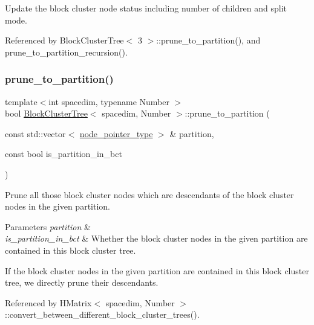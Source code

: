 Update the block cluster node status including number of children and split mode.

Referenced by Block\+Cluster\+Tree$<$ 3 $>$\+::prune\+\_\+to\+\_\+partition(), and prune\+\_\+to\+\_\+partition\+\_\+recursion().

\mbox{\label{classBlockClusterTree_af1663a109b6fd5c67c85e9bb88a54a13}} 
\subsubsection{\texorpdfstring{prune\+\_\+to\+\_\+partition()}{prune\_to\_partition()}}
{\footnotesize\ttfamily template$<$int spacedim, typename Number $>$ \\
bool \hyperlink{classBlockClusterTree}{Block\+Cluster\+Tree}$<$ spacedim, Number $>$\+::prune\+\_\+to\+\_\+partition (\begin{DoxyParamCaption}\item[{const std\+::vector$<$ \hyperlink{classTreeNode}{node\+\_\+pointer\+\_\+type} $>$ \&}]{partition,  }\item[{const bool}]{is\+\_\+partition\+\_\+in\+\_\+bct }\end{DoxyParamCaption})}

Prune all those block cluster nodes which are descendants of the block cluster nodes in the given partition.


\begin{DoxyParams}{Parameters}
{\em partition} & \\
\hline
{\em is\+\_\+partition\+\_\+in\+\_\+bct} & Whether the block cluster nodes in the given {\ttfamily partition} are contained in this block cluster tree. \\
\hline
\end{DoxyParams}
If the block cluster nodes in the given {\ttfamily partition} are contained in this block cluster tree, we directly prune their descendants.

Referenced by H\+Matrix$<$ spacedim, Number $>$\+::convert\+\_\+between\+\_\+different\+\_\+block\+\_\+cluster\+\_\+trees().

\mbox{\label{classBlockClusterTree_a0415fe94fd480bbb985a45dc691e2bed}} 
